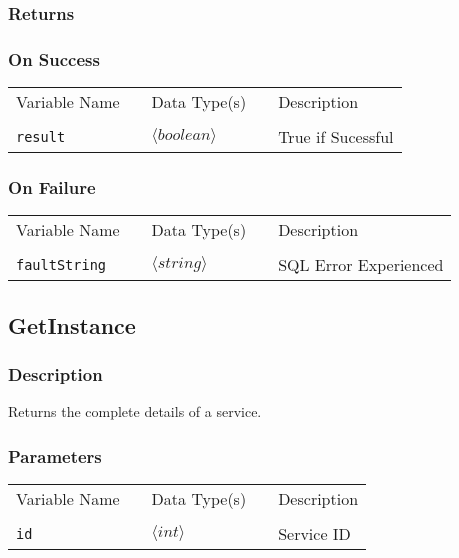 \subsubsection{Returns}

\subsubsection{On Success}

\begin{tabular}{lllll}
Variable Name	&		&	Data Type(s)		&	&	Description	\\
				&	&	&	&	\\
\verb!result! & \hspace{15mm} & $\langle boolean\rangle $ & \hspace{15mm} & True if Sucessful \\
\end{tabular}

\subsubsection{On Failure}

\begin{tabular}{lllll}
Variable Name	&		&	Data Type(s)		&	&	Description	\\
				&	&	&	&	\\
\verb!faultString! & \hspace{15mm} & $\langle string\rangle $ & \hspace{15mm} & SQL Error Experienced \\
\end{tabular}

\subsection{GetInstance}

\subsubsection{Description}

Returns the complete details of a service.

\subsubsection{Parameters}

\begin{tabular}{lllll}
Variable Name	&		&	Data Type(s)		&	&	Description	\\
				&	&	&	&	\\
\verb!id! & \hspace{15mm} & $\langle int\rangle $ & \hspace{15mm} & Service ID \\
\end{tabular}

